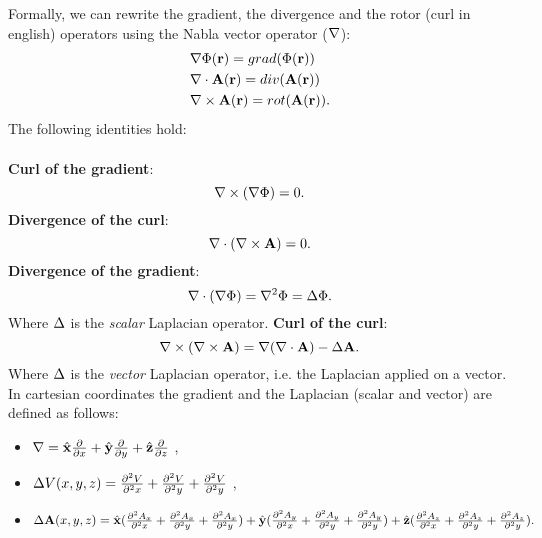 Formally, we can rewrite the gradient, the divergence and the rotor (curl in english) operators using the Nabla vector operator ($\mathbf{\nabla}$):
\begin{align*}
  & \mathbf{\nabla} \Phi(\mathbf{r})  = grad (\Phi( \mathbf{r} )) \\
  & \mathbf{\nabla}\cdot \mathbf{A}(\mathbf{r}) = div (\mathbf{A}(\mathbf{r})) \\ 
  & \mathbf{\nabla}\times \mathbf{A}(\mathbf{r}) = rot (\mathbf{A}( \mathbf{r} )).
\end{align*}
The following identities hold:\\\\
\textbf{Curl of the gradient}:
\begin{equation}
  \label{eq:curlofgradient}
  \mathbf{\nabla}\times (\mathbf{\nabla}\Phi) = 0 .
\end{equation}
\textbf{Divergence of the curl}:
\begin{equation}
  \label{eq:divergenceofcurl}
  \mathbf{\nabla}\cdot (\mathbf{\nabla}\times \mathbf{A}) = 0 .
\end{equation}
\textbf{Divergence of the gradient}:
\begin{equation}
  \label{eq:divergenceofgradient}
  \mathbf{\nabla}\cdot (\mathbf{\nabla} \Phi) = \mathbf{\nabla}^2 \Phi = \Delta \Phi.
\end{equation}
Where $\Delta$ is the \emph{scalar} Laplacian operator. 
\textbf{Curl of the curl}:
\begin{equation}
  \label{eq:curlofcurl}
  \mathbf{\nabla}\times (\mathbf{\nabla}\times \mathbf{A}) = \mathbf{\nabla} (\mathbf{\nabla}\cdot \mathbf{A})-\Delta \mathbf{A}. 
\end{equation}
Where $\Delta$ is the \emph{vector} Laplacian operator, i.e. the Laplacian applied on a vector. 
\\

In cartesian coordinates the gradient and the Laplacian (scalar and vector) are defined as follows: 
\begin{itemize}
  \item $\mathbf{\nabla} = \hat{\mathbf{x}} \frac{\partial}{\partial x} + \hat{\mathbf{y}} \frac{\partial}{\partial y}+\hat{\mathbf{z}}\frac{\partial}{\partial z}$ ,
  \item $\Delta V(x,y,z) = \frac{\partial^2 V}{\partial^2 x}+\frac{\partial^2 V}{\partial^2 y} +\frac{\partial^2 V}{\partial^2 y}$ ,
  \item $\Delta \mathbf{A}(x,y,z) =\hat{\mathbf{x}} ( \frac{\partial^2 A_x}{\partial^2 x}+\frac{\partial^2 A_x}{\partial^2 y} +\frac{\partial^2 A_x}{\partial^2 y}) + \hat{\mathbf{y}}(\frac{\partial^2 A_y}{\partial^2 x}+\frac{\partial^2 A_y}{\partial^2 y} +\frac{\partial^2 A_y}{\partial^2 y})+\hat{\mathbf{z}}(\frac{\partial^2 A_z}{\partial^2 x}+\frac{\partial^2 A_z}{\partial^2 y} +\frac{\partial^2 A_z}{\partial^2 y}).$
\end{itemize}

